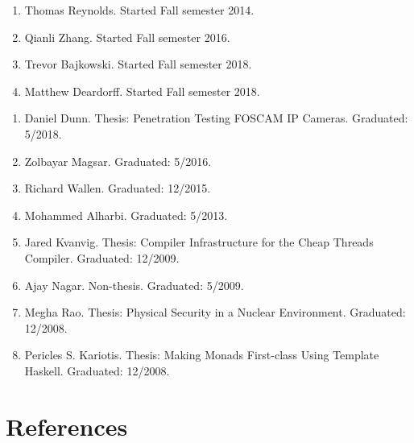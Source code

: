 \documentclass[11pt]{article}
\begin{document}

\begin{enumerate}[leftmargin=0.0mm]

\item Thomas Reynolds. Started Fall semester 2014.

\item Qianli Zhang. Started Fall semester 2016.

\item Trevor Bajkowski. Started Fall semester 2018.

\item Matthew Deardorff. Started Fall semester 2018.

\end{enumerate}

%
%


\begin{enumerate}[leftmargin=0.0mm]
\item Daniel Dunn. Thesis: Penetration Testing FOSCAM IP Cameras. Graduated: 5/2018.
\item Zolbayar Magsar. Graduated: 5/2016.
\item Richard Wallen. Graduated: 12/2015.
\item Mohammed Alharbi. Graduated: 5/2013.
\item Jared Kvanvig. Thesis: Compiler Infrastructure for the Cheap Threads Compiler. Graduated: 12/2009.
\item Ajay Nagar.  Non-thesis. Graduated: 5/2009.
\item Megha Rao. Thesis: Physical Security in a Nuclear Environment. Graduated: 12/2008.
\item Pericles S. Kariotis. Thesis: Making Monads First-class Using Template Haskell. Graduated: 12/2008.
\end{enumerate}


\newpage
\section{References}
\end{document}
